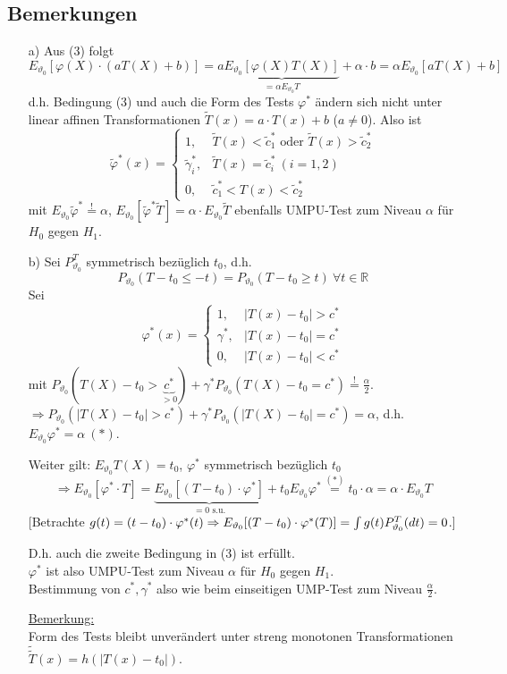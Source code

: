 \documentclass[a4paper,11pt,twoside,titlepage]{article}
\newcommand{\R}{{\mathbb R}}
\begin{document}
\subsection{Bemerkungen}
\begin{itemize}
\item[a)] Aus (3) folgt 
\[E_{\vartheta_0}[\varphi(X)\cdot(aT(X)+b)]=a\underbrace{E_{\vartheta_0}[\varphi(X)T(X)]}_{=\alpha E_{\vartheta_0}T}+\alpha\cdot b=\alpha E_{\vartheta_0}[aT(X)+b]\]
d.h. Bedingung (3) und auch die Form des Tests $\varphi^\ast$ ändern sich nicht unter linear affinen Transformationen $\tilde T(x)=a\cdot T(x)+b$ ($a\neq0$). Also ist 
\[\tilde \varphi^\ast(x)=\left\{\begin{array}{cl} 1,&\tilde T(x)<\tilde c_1^\ast\mbox{ oder }\tilde T(x)>\tilde c_2^\ast\\
\tilde\gamma_i^\ast,&\tilde T(x)=\tilde c_i^\ast\ (i=1,2)\\
0,&\tilde c_1^\ast<T(x)<\tilde c_2^\ast\end{array}\right.\]
mit $E_{\vartheta_0}\tilde\varphi^\ast\stackrel{!}{=}\alpha$, $E_{\vartheta_0}[\tilde\varphi^\ast\tilde T]=\alpha\cdot E_{\vartheta_0}\tilde T$ ebenfalls UMPU-Test zum Niveau $\alpha$ für $H_0$ gegen $H_1$.
\item[b)] Sei $P_{\vartheta_0}^T$ symmetrisch bezüglich $t_0$, d.h.
\[P_{\vartheta_0}(T-t_0\leq -t)=P_{\vartheta_0}(T-t_0\geq t)\ \forall t\in\R\]
Sei \[\varphi^\ast(x)=\left\{\begin{array}{cl} 1,&|T(x)-t_0|> c^\ast\\
\gamma^\ast,&|T(x)-t_0|= c^\ast\\0,&|T(x)-t_0|< c^\ast\end{array}\right.\]
mit $P_{\vartheta_0}(T(X)-t_0>\underbrace{c^\ast}_{>0})+\gamma^\ast P_{\vartheta_0}(T(X)-t_0=c^\ast)\stackrel{!}{=}\frac\alpha2$.\\
$\Rightarrow P_{\vartheta_0}(|T(X)-t_0|>c^\ast)+\gamma^\ast P_{\vartheta_0}(|T(X)-t_0|=c^\ast)=\alpha$, d.h.\\ $E_{\vartheta_0}\varphi^\ast=\alpha\ (\ast)$.

Weiter gilt: $E_{\vartheta_0}T(X)=t_0$, $\varphi^\ast$ symmetrisch bezüglich $t_0$
\[\Rightarrow E_{\vartheta_0}[\varphi^\ast\cdot T]=\underbrace{E_{\vartheta_0}[(T-t_0)\cdot\varphi^\ast]}_{=0\mbox{ s.u.}}+t_0 E_{\vartheta_0}\varphi^\ast\stackrel{(\ast)}{=}t_0\cdot \alpha=\alpha\cdot E_{\vartheta_0}T\]
[Betrachte $g(t)=(t-t_0)\cdot\varphi^\ast(t)\\ \Rightarrow E_{\vartheta_0}[(T-t_0)\cdot\varphi^\ast(T)]=\int g(t)P_{\vartheta_0}^T(dt)=0$.]

D.h. auch die zweite Bedingung in (3) ist erfüllt.\\
$\varphi^\ast$ ist also UMPU-Test zum Niveau $\alpha$ für $H_0$ gegen $H_1$.\\
Bestimmung von $c^\ast,\gamma^\ast$ also wie beim einseitigen UMP-Test zum Niveau $\frac\alpha2$.

\underline{Bemerkung:}\\
Form des Tests bleibt unverändert unter streng monotonen Transformationen $\tilde{\tilde{T}}(x)=h(|T(x)-t_0|)$.
\end{itemize}
\end{document}
